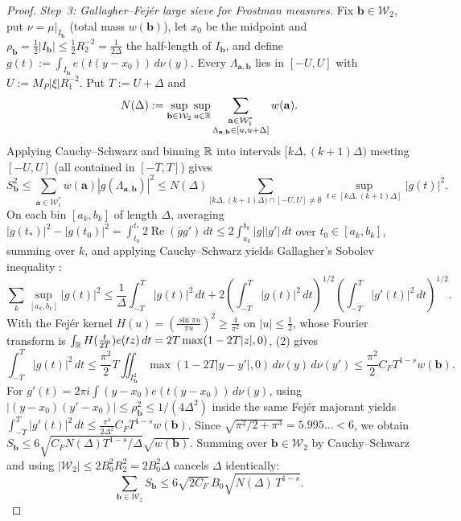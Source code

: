 \documentclass[11pt]{article}
\DeclareMathOperator{\RePart}{Re}
\begin{document}
\begin{proof}
\emph{Step~3: Gallagher--Fej\'er large sieve for Frostman measures.}
Fix $\mathbf{b}\in\mathcal{W}_2$, put $\nu=\mu|_{I_{\mathbf{b}}}$ (total mass $w(\mathbf{b})$), let $x_0$ be the midpoint and $\rho_{\mathbf{b}}=\frac12|I_{\mathbf{b}}|\le\frac12R_2^{-2}=\frac1{2\Delta}$ the half-length of $I_{\mathbf{b}}$, and define $g(t):=\int_{I_{\mathbf{b}}}e(t(y-x_0))\,d\nu(y)$. Every $\Lambda_{\mathbf{a},\mathbf{b}}$ lies in $[-U,U]$ with $U:=M_P|\xi|R_1^{-2}$. Put $T:=U+\Delta$ and
\[
N(\Delta):=\sup_{\mathbf{b}\in\mathcal{W}_2}\sup_{u\in\mathbb R}\sum_{\substack{\mathbf{a}\in\mathcal{W}_1^*\\\Lambda_{\mathbf{a},\mathbf{b}}\in[u,u+\Delta]}}w(\mathbf{a}).
\]
Applying Cauchy--Schwarz and binning $\mathbb R$ into intervals $[k\Delta,(k+1)\Delta)$ meeting $[-U,U]$ (all contained in $[-T,T]$) gives
\[
S_{\mathbf{b}}^2\le\sum_{\mathbf{a}\in\mathcal{W}_1^*}w(\mathbf{a})|g(\Lambda_{\mathbf{a},\mathbf{b}})|^2\le N(\Delta)\sum_{[k\Delta,(k+1)\Delta)\cap[-U,U]\ne\emptyset}\sup_{t\in[k\Delta,(k+1)\Delta]}|g(t)|^2.
\]
On each bin $[a_k,b_k]$ of length $\Delta$, averaging $|g(t_*)|^2-|g(t_0)|^2=\int_{t_0}^{t_*}2\RePart(\overline{g}g')\,dt\le2\int_{a_k}^{b_k}|g||g'|\,dt$ over $t_0\in[a_k,b_k]$, summing over $k$, and applying Cauchy--Schwarz yields Gallagher's Sobolev inequality \cite{Gallagher1970}:
\[
\sum_k\sup_{[a_k,b_k]}|g(t)|^2\le\frac1\Delta\int_{-T}^T|g(t)|^2\,dt+2\left(\int_{-T}^T|g(t)|^2\,dt\right)^{1/2}\left(\int_{-T}^T|g'(t)|^2\,dt\right)^{1/2}.
\]
With the Fej\'er kernel $H(u)=(\frac{\sin\pi u}{\pi u})^2\ge\frac4{\pi^2}$ on $|u|\le\frac12$, whose Fourier transform is $\int_{\mathbb R}H(\frac{t}{2T})e(tz)\,dt=2T\max(1-2T|z|,0)$, (2) gives
\[
\int_{-T}^T|g(t)|^2\,dt\le\frac{\pi^2}{2}T\iint_{I_{\mathbf{b}}^2}\max(1-2T|y-y'|,0)\,d\nu(y)\,d\nu(y')\le\frac{\pi^2}{2}C_F T^{1-s}w(\mathbf{b}).
\]
For $g'(t)=2\pi i\int(y-x_0)e(t(y-x_0))\,d\nu(y)$, using $|(y-x_0)(y'-x_0)|\le\rho_{\mathbf{b}}^2\le1/(4\Delta^2)$ inside the same Fej\'er majorant yields $\int_{-T}^T|g'(t)|^2\,dt\le\frac{\pi^4}{2\Delta^2}C_FT^{1-s}w(\mathbf{b})$. Since $\sqrt{\pi^2/2+\pi^3}=5.995\dots<6$, we obtain $S_{\mathbf{b}}\le 6\sqrt{C_F N(\Delta)T^{1-s}/\Delta}\sqrt{w(\mathbf{b})}$. Summing over $\mathbf{b}\in\mathcal{W}_2$ by Cauchy--Schwarz and using $|\mathcal{W}_2|\le 2B_0^2R_2^2=2B_0^2\Delta$ cancels $\Delta$ identically:
\begin{equation}\label{eq:large-sieve}
\sum_{\mathbf{b}\in\mathcal{W}_2}S_{\mathbf{b}}\le 6\sqrt{2C_F}\,B_0\sqrt{N(\Delta)\,T^{1-s}}.
\end{equation}


\end{proof}
\end{document}
